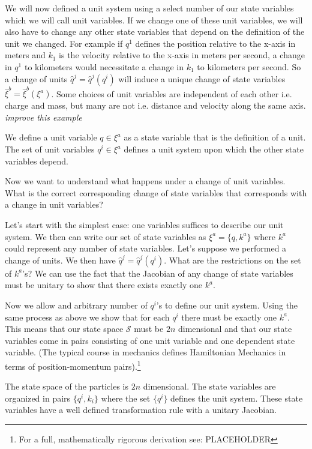 \documentclass{article}
\begin{document}
	We will now defined a unit system using a select number of our state variables which we will call unit variables. If we change one of these unit variables, we will also have to change any other state variables that depend on the definition of the unit we changed. For example if $q^1$ defines the position relative to the x-axis in meters and $k_1$ is the velocity relative to the x-axis in meters per second, a change in $q^1$ to kilometers would necessitate a change in $k_1$ to kilometers per second. So a change of units $\hat{q}^j = \hat{q}^j(q^i)$ will induce a unique change of state variables $\hat{\xi}^b = \hat{\xi}^b(\xi^a)$. Some choices of unit variables are independent of each other i.e. charge and mass, but many are not i.e. distance and velocity along the same axis. \emph{improve this example}

\begin{defn}
	We define a unit variable $q \in \xi^a$ as a state variable that is the definition of a unit. The set of unit variables $q^i \in \xi^a$ defines a unit system upon which the other state variables depend.
\end{defn}

	Now we want to understand what happens under a change of unit variables. What is the correct corresponding change of state variables that corresponds with a change in unit variables? 
	
	Let's start with the simplest case: one variables suffices to describe our unit system. We then can write our set of state variables as $\xi^a = \{q,k^a\}$ where $k^a$ could represent any number of state variables. Let's suppose we performed a change of units. We then have $\hat{q}^j = \hat{q}^j(q^i)$. What are the restrictions on the set of $k^a$'s? We can use the fact that the Jacobian of any change of state variables must be unitary to show that there exists exactly one $k^a$. 
	
	Now we allow and arbitrary number of $q^i$'s to define our unit system. Using the same process as above we show that for each $q^i$ there must be exactly one $k^a$. This means that our state space $\mathcal{S}$ must be $2n$ dimensional and that our state variables come in pairs consisting of one unit variable and one dependent state variable. (The typical course in mechanics defines Hamiltonian Mechanics in terms of position-momentum pairs).\footnote{For a full, mathematically rigorous derivation see: PLACEHOLDER}

\begin{prop}
	The state space of the particles is $2n$ dimensional. The state variables are organized in pairs $\{q^i, k_i\}$ where the set $\{q^i\}$ defines the unit system. These state variables have a well defined transformation rule with a unitary Jacobian.
\end{prop}
\end{document}
